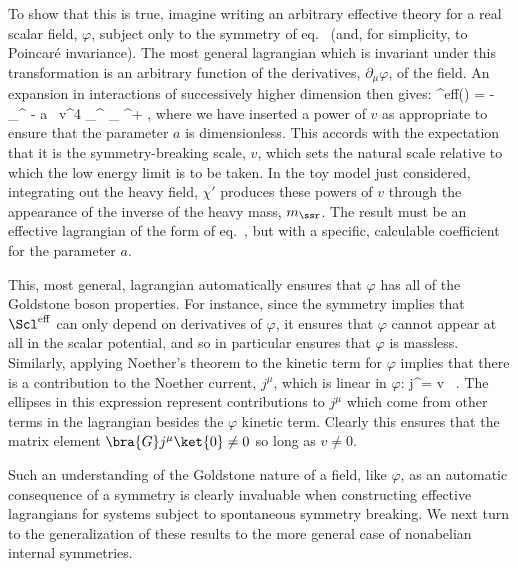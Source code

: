 \documentclass[12pt]{report}
\def\leff{\Scl^{\rm eff}}
\begin{document}
To show that this is true, imagine writing an arbitrary
effective theory for a real scalar field, $\varphi$,
subject only to the symmetry of eq.~
(and, for simplicity, to Poincar\'e invariance).  The most
general lagrangian which is invariant under this
transformation is an arbitrary function of the derivatives,
$\partial_\mu\varphi$, of the field. An expansion in
interactions of successively higher dimension then gives:
%
\eq
\label{abelgbaction}
\leff(\varphi) = - \hf \; \partial_\mu \varphi \partial^\mu
\varphi - {a \, v^4} \;  \partial_\mu \varphi \partial^\mu \varphi \;
\partial_\nu \varphi
\partial^\nu \varphi + \cdots,
\eeq
%
where we have inserted a power of $v$ as appropriate to
ensure that the parameter $a$ is dimensionless. This
accords with the expectation that it is the
symmetry-breaking scale, $v$, which sets the natural scale
relative to which the low energy limit is to be taken. In
the toy model just considered, integrating out the heavy
field, $\chi'$ produces these powers of $v$ through the
appearance of the inverse of the heavy mass, $m_\ssr$. The
result must be an effective lagrangian of the form of 
eq.~, but with a specific, calculable
coefficient for the parameter $a$.

This, most general, lagrangian automatically ensures that
$\varphi$ has all of the Goldstone boson properties. For
instance, since the symmetry implies that $\leff$ can only
depend on derivatives of 
$\varphi$, it ensures that $\varphi$ cannot appear at all
in the scalar potential, and so in particular ensures that
$\varphi$ is massless. Similarly, applying Noether's
theorem to the kinetic term for $\varphi$ implies that
there is a contribution to the Noether current, $j^\mu$,
which is linear in $\varphi$: 
%
\eq
\label{abelgbncex}
j^\mu =  \; v \;  \, . \eeq
%
The ellipses in this expression represent contributions to
$j^\mu$ which come from other terms in the lagrangian
besides the 
$\varphi$ kinetic term. Clearly this ensures that the
matrix element $\bra{G} j^\mu \ket{0} \neq 0$ so long as $v
\neq 0$.

Such an understanding of the Goldstone nature of a field,
like 
$\varphi$, as an automatic consequence of a symmetry is
clearly invaluable when constructing effective lagrangians
for systems subject to spontaneous symmetry breaking. We
next turn to the generalization of these results to the
more general case of nonabelian internal symmetries.
\end{document}
